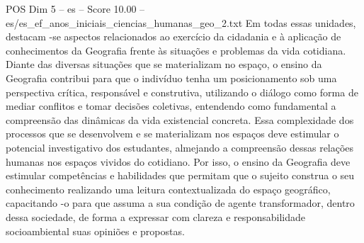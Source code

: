 \begin{textsample}{POS Dim 5 – es – Score 10.00 – es/es\_ef\_anos\_iniciais\_ciencias\_humanas\_geo\_2.txt}  \label{ex:f5_pos_107}
Em todas essas unidades, destacam -se aspectos relacionados ao exercício da cidadania e à aplicação de conhecimentos da Geografia frente às situações e problemas da vida cotidiana.
Diante das diversas situações que se materializam no espaço, o ensino da Geografia contribui para que o indivíduo tenha um posicionamento sob uma perspectiva crítica, responsável e construtiva, utilizando o diálogo como forma de mediar conflitos e tomar decisões coletivas, entendendo como fundamental a compreensão das dinâmicas da vida existencial concreta.
Essa complexidade dos processos que se desenvolvem e se materializam nos espaços deve estimular o potencial investigativo dos estudantes, almejando a compreensão dessas relações humanas nos espaços vividos do cotidiano.
Por isso, o ensino da Geografia deve estimular competências e habilidades que permitam que o sujeito construa o seu conhecimento realizando uma leitura contextualizada do espaço geográfico, capacitando -o para que assuma a sua condição de agente transformador, dentro dessa sociedade, de forma a expressar com clareza e responsabilidade socioambiental suas opiniões e propostas.

\end{textsample}
